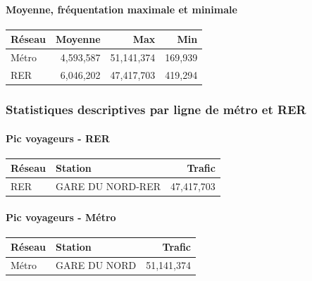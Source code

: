 \documentclass[]{article}
\let\oldparagraph\paragraph
\renewcommand{\paragraph}[1]{\oldparagraph{#1}\mbox{}}
\begin{document}
\hypertarget{moyenne-fruxe9quentation-maximale-et-minimale}{%
\paragraph{Moyenne, fréquentation maximale et
minimale}\label{moyenne-fruxe9quentation-maximale-et-minimale}}

\begin{table}[H]
\centering
\begin{tabular}{l|r|r|r}
\hline
Réseau & Moyenne & Max & Min\\
\hline
Métro & 4,593,587 & 51,141,374 & 169,939\\
\hline
RER & 6,046,202 & 47,417,703 & 419,294\\
\hline
\end{tabular}
\end{table}

\hypertarget{statistiques-descriptives-par-ligne-de-muxe9tro-et-rer}{%
\subsubsection{Statistiques descriptives par ligne de métro et
RER}\label{statistiques-descriptives-par-ligne-de-muxe9tro-et-rer}}

\hypertarget{pic-voyageurs---rer}{%
\paragraph{Pic voyageurs - RER}\label{pic-voyageurs---rer}}

\begin{table}[H]
\centering
\begin{tabular}{l|l|r}
\hline
Réseau & Station & Trafic\\
\hline
RER & GARE DU NORD-RER & 47,417,703\\
\hline
\end{tabular}
\end{table}

\hypertarget{pic-voyageurs---muxe9tro}{%
\paragraph{Pic voyageurs - Métro}\label{pic-voyageurs---muxe9tro}}

\begin{table}[H]
\centering
\begin{tabular}{l|l|r}
\hline
Réseau & Station & Trafic\\
\hline
Métro & GARE DU NORD & 51,141,374\\
\hline
\end{tabular}
\end{table}
\end{document}
